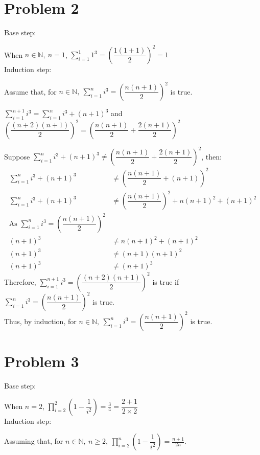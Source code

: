 \documentclass{article}
\begin{document}
\section*{Problem 2}
    Base step:

    When \(n\in \mathbb{N},\ n=1\), \(\displaystyle{\sum_{i = 1}^{1} 1^3}= \left(\dfrac{1(1+1)}{2}\right)^2=1\)\\
    Induction step:

    Assume that, for \(n\in \mathbb{N},\ \displaystyle{\sum_{i=1}^n i^3}=\left(\dfrac{n(n+1)}{2}\right)^2\) is true.

    \(\displaystyle{\sum^{n+1}_{i=1}i^3}=\displaystyle{\sum_{i=1}^n i^3}+(n+1)^3\) and \(\left(\dfrac{(n+2)(n+1)}{2}\right)^2=\left(\dfrac {n(n+1)}{2}+\dfrac{2(n+1)}{2}\right)^2\)
    
    Suppose \(\displaystyle{\sum_{i=1}^n i^3}+(n+1)^3\neq \left(\dfrac {n(n+1)}{2}+\dfrac{2(n+1)}{2}\right)^2\), then:\\
    \begin{align*}
        \sum_{i=1}^n i^3+(n+1)^3&\neq \left(\dfrac {n(n+1)}{2}+(n+1)\right)^2\\
        \sum_{i=1}^n i^3+(n+1)^3&\neq \left(\dfrac {n(n+1)}{2}\right)^2 +n(n+1)^2+(n+1)^2\\
        \text{As } \displaystyle{\sum_{i=1}^n i^3}=\left(\dfrac{n(n+1)}{2}\right)^2\\
        (n+1)^3&\neq n(n+1)^2+(n+1)^2\\
        (n+1)^3&\neq (n+1)(n+1)^2\\
        (n+1)^3&\neq (n+1)^3
    \end{align*}
    Therefore, \(\displaystyle{\sum_{i=1}^{n+1} i^3} = \left(\dfrac {(n+2)(n+1)}{2}\right)^2\) is true if \(\displaystyle{\sum_{i=1}^n i^3}=\left(\dfrac{n(n+1)}{2}\right)^2\) is true.\\
    Thus, by induction, for \(n\in \mathbb{N},\ \displaystyle{\sum_{i=1}^n i^3}=\left(\dfrac{n(n+1)}{2}\right)^2\) is true.
\newpage
\section*{Problem 3}
    Base step:

    When \(n=2\), \(\displaystyle{\prod ^2_{i=2}\left(1-\dfrac{1}{i^2}\right)=\frac3 4=\dfrac {2+1}{2\times 2}}\)\\
    Induction step:

    Assuming that, for \(n\in \mathbb{N},\ n\geqslant2,\ \displaystyle {\prod ^n_{i=2}\left(1-\dfrac{1}{i^2}\right)=\frac{n+1}{2n}}\).
    
\end{document}
